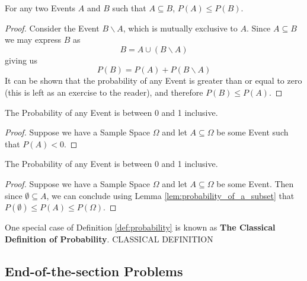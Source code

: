 \begin{lemma}
    For any two Events $A$ and $B$ such that $A\subseteq B$, $P(A)\le P(B)$.
    
    \begin{proof}
    Consider the Event $B\backslash A$, which is mutually exclusive to $A$. Since $A\subseteq B$ we may express $B$ as
    \[
        B=A\cup (B\backslash A)
    \]
    giving us
    \[
        P(B)=P(A)+P(B\backslash A)
    \]
    It can be shown that the probability of any Event is greater than or equal to zero (this is left as an exercise to the reader), and therefore $P(B)\le P(A)$.
    \end{proof}
\end{lemma}
\begin{lemma}
    \label{lem:probability_of_a_subset}
    The Probability of any Event is between 0 and 1 inclusive.
    \begin{proof}
        Suppose we have a Sample Space $\Omega$ and let $A\subseteq\Omega$ be some Event such that $P(A)<0$. 
    \end{proof}
\end{lemma}
\begin{lemma}
    \label{lem:probability_range}
    The Probability of any Event is between 0 and 1 inclusive.
    \begin{proof}
        Suppose we have a Sample Space $\Omega$ and let $A\subseteq\Omega$ be some Event. Then since $\emptyset\subseteq A$, we can conclude using Lemma \ref{lem:probability_of_a_subset} that $P(\emptyset)\le P(A) \le P(\Omega)$.
    \end{proof}
\end{lemma}

One special case of Definition \ref{def:probability} is known as \textbf{The Classical Definition of Probability}. \todo CLASSICAL DEFINITION

\subsection{End-of-the-section Problems}\label{sec:problaw_eosp}

